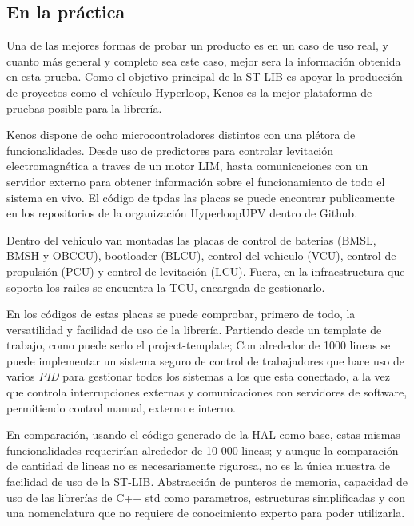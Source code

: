 \documentclass{report}
\begin{document}
\subsection{En la práctica}
Una de las mejores formas de probar un producto es en un caso de uso real, y cuanto más general y completo sea este caso, mejor sera la información obtenida en esta prueba. Como el objetivo principal de la ST-LIB es apoyar la producción de proyectos como el vehículo Hyperloop, Kenos es la mejor plataforma de pruebas posible para la librería. 
\par \vspace{0.3cm}
Kenos dispone de ocho microcontroladores distintos con una plétora de funcionalidades. Desde uso de predictores para controlar levitación electromagnética a traves de un motor LIM, hasta comunicaciones con un servidor externo para obtener información sobre el funcionamiento de todo el sistema en vivo. El código de tpdas las placas se puede encontrar publicamente en los repositorios de la organización HyperloopUPV dentro de Github. \cite{web:github:HyperloopUPV}
\par
Dentro del vehiculo van montadas las placas de control de baterias (BMSL, BMSH y OBCCU), bootloader (BLCU), control del vehiculo (VCU), control de propulsión (PCU) y control de levitación (LCU). Fuera, en la infraestructura que soporta los railes se encuentra la TCU, encargada de gestionarlo.
\par \vspace{0.3cm}
En los códigos de estas placas se puede comprobar, primero de todo, la versatilidad y facilidad de uso de la librería. Partiendo desde un template de trabajo, como puede serlo el project-template; Con alrededor de 1000 lineas se puede implementar un sistema seguro de control de trabajadores que hace uso de varios \textit{PID} para gestionar todos los sistemas a los que esta conectado, a la vez que controla interrupciones externas y comunicaciones con servidores de software, permitiendo control manual, externo e interno. \par
En comparación, usando el código generado de la HAL como base, estas mismas funcionalidades requerirían alrededor de 10 000 lineas; y aunque la comparación de cantidad de lineas no es necesariamente rigurosa, no es la única muestra de facilidad de uso de la ST-LIB. Abstracción de punteros de memoria, capacidad de uso de las librerías de C++ std como parametros, estructuras simplificadas y con una nomenclatura que no requiere de conocimiento experto para poder utilizarla.
\par \vspace{0.3cm}
\end{document}
